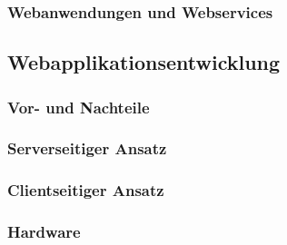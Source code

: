 \subsubsection{Webanwendungen und Webservices}\label{sec:webanwenservices}


\subsection{Webapplikationsentwicklung}\label{sec:softwareentwicklung}
\subsubsection{Vor- und Nachteile}\label{sec:vorundnachteileweb}
\subsubsection{Serverseitiger Ansatz}\label{sec:serverseitgeransatz}
\subsubsection{Clientseitiger Ansatz}\label{sec:clientseitigeransatz}
\subsubsection{Hardware}\label{sec:hardware}